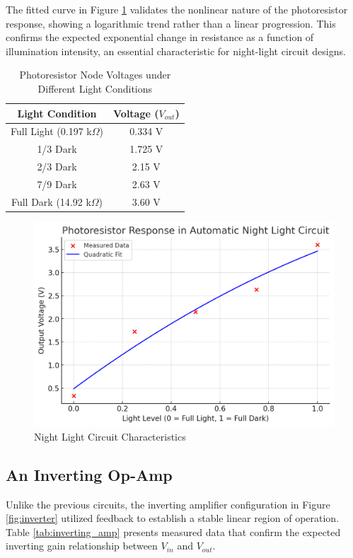 \documentclass[12pt]{article}
\begin{document}
The fitted curve in Figure \ref{fig:exp3} validates the nonlinear nature of the photoresistor response, showing a logarithmic trend rather than a linear progression. This confirms the expected exponential change in resistance as a function of illumination intensity, an essential characteristic for night-light circuit designs.
\begin{table}[H]
	\centering
	\begin{tabular}{|c|c|}
		\hline
		\textbf{Light Condition}     & \textbf{Voltage ($V_{out}$)} \\
		\hline
		Full Light (0.197 k$\Omega$) & 0.334 V                      \\
		\hline
		1/3 Dark                     & 1.725 V                      \\
		\hline
		2/3 Dark                     & 2.15 V                       \\
		\hline
		7/9 Dark                     & 2.63 V                       \\
		\hline
		Full Dark (14.92 k$\Omega$)  & 3.60 V                       \\
		\hline
	\end{tabular}
	\caption{Photoresistor Node Voltages under Different Light Conditions}
	\label{tab:photoresistor}
\end{table}


\begin{figure}[H]
	\centering
	\includegraphics[width=12cm]{03_exp3}
	\caption{Night Light Circuit Characteristics}
	\label{fig:exp3}
\end{figure}

\subsection{An Inverting Op-Amp}
Unlike the previous circuits, the inverting amplifier configuration in Figure \ref{fig:inverter} utilized feedback to establish a stable linear region of operation. Table \ref{tab:inverting_amp} presents measured data that confirm the expected inverting gain relationship between $V_{in}$ and $V_{out}$.
\end{document}

